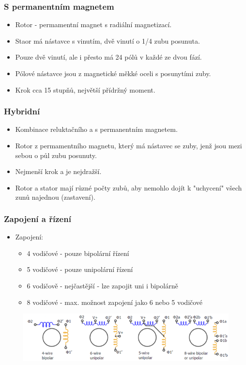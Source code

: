 \subsubsection*{S permanentním magnetem}
\begin{itemize}
  \item Rotor - permamentní magnet s radiální magnetizací.
  \item Staor má nástavce s vinutím, dvě vinutí o 1/4 zubu posunuta.
  \item Pouze dvě vinutí, ale i přesto má 24 pólů v každé ze dvou fází.
  \item Pólové nástavce jsou z magnetické měkké oceli s posunytími zuby.
  \item Krok cca 15 stupňů, největší přídržný moment.
\end{itemize}

\subsubsection*{Hybridní}
\begin{itemize}
  \item Kombinace reluktačního a s permanentním magnetem. 
  \item Rotor z permamentního magnetu, který má nástavec se zuby, jenž jsou mezi sebou o půl zubu posunuty.
  \item Nejmenší krok a je nejdražší.
  \item Rotor a stator mají různé počty zubů, aby nemohlo dojít k "uchycení" všech zunů najednou (zastavení).
\end{itemize}

\subsubsection*{Zapojení a řízení}
\begin{itemize}
  \item Zapojení: \begin{itemize}
    \item 4 vodičové - pouze bipolární řízení
    \item 5 vodičové - pouze unipolární řízení
    \item 6 vodičově - nejčastější - lze zapojit uni i bipolárně
    \item 8 vodičové - max. možnost zapojení jako 6 nebo 5 vodičové
  \end{itemize}
\end{itemize}

\begin{figure}[h]
  \begin{center}
    \includegraphics[scale = 1]{img/picture8.png}
  \end{center}
\end{figure}


